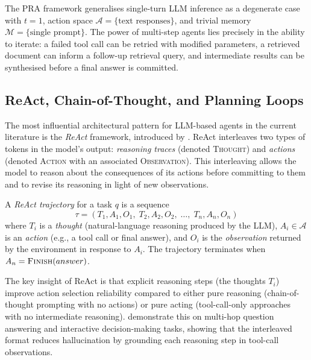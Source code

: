 \begin{deepdive}
The PRA framework generalises single-turn LLM inference as a degenerate case with
$t = 1$, action space $\mathcal{A} = \{\text{text responses}\}$, and trivial memory
$\mathcal{M} = \{\text{single prompt}\}$. The power of multi-step agents lies
precisely in the ability to iterate: a failed tool call can be retried with modified
parameters, a retrieved document can inform a follow-up retrieval query, and
intermediate results can be synthesised before a final answer is committed.


\subsection{ReAct, Chain-of-Thought, and Planning Loops}
\label{subsec:react}

The most influential architectural pattern for LLM-based agents in the current
literature is the \emph{ReAct} framework, introduced by \citet{yao2022react}. ReAct
interleaves two types of tokens in the model's output: \emph{reasoning traces} (denoted
\textsc{Thought}) and \emph{actions} (denoted \textsc{Action} with an associated
\textsc{Observation}). This interleaving allows the model to reason about the
consequences of its actions before committing to them and to revise its reasoning in
light of new observations.

\begin{definition}
\label{def:react-trajectory}
A \emph{ReAct trajectory} for a task $q$ is a sequence
\[
  \tau = (T_1, A_1, O_1,\; T_2, A_2, O_2,\; \ldots,\; T_n, A_n, O_n)
\]
where $T_i$ is a \emph{thought} (natural-language reasoning produced by the LLM),
$A_i \in \mathcal{A}$ is an \emph{action} (e.g., a tool call or final answer), and
$O_i$ is the \emph{observation} returned by the environment in response to $A_i$.
The trajectory terminates when $A_n = \textsc{Finish}(answer)$.
\end{definition}

The key insight of ReAct is that explicit reasoning steps (the thoughts $T_i$) improve
action selection reliability compared to either pure reasoning (chain-of-thought
prompting with no actions) or pure acting (tool-call-only approaches with no
intermediate reasoning). \citet{yao2022react} demonstrate this on multi-hop question
answering and interactive decision-making tasks, showing that the interleaved format
reduces hallucination by grounding each reasoning step in tool-call observations.


\end{deepdive}
